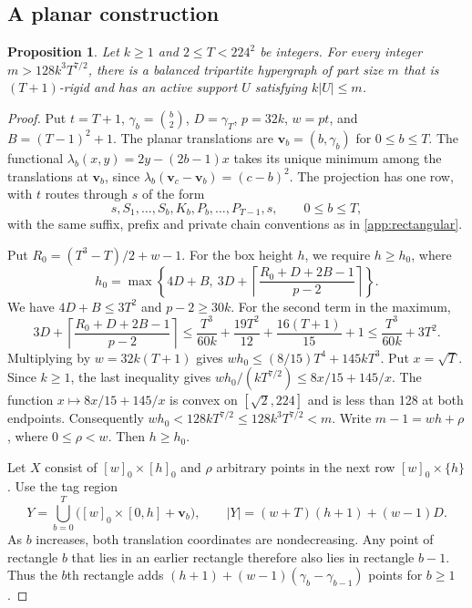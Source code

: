 \documentclass[10pt]{article}
\numberwithin{equation}{section}
\newtheorem{proposition}[proposition]{Proposition}
\theoremstyle{definition}
\begin{document}
\subsection{A planar construction}\label{app:planar}

\begin{proposition}\label{prop:planar-factor}
Let $k\ge1$ and $2\le T<224^2$ be integers. For every integer $m>128k^3T^{7/2}$, there is a balanced tripartite hypergraph of part size $m$ that is $(T+1)$-rigid and has an active support $U$ satisfying $k|U|\le m$.
\end{proposition}

\begin{proof}
Put $t=T+1$, $\gamma_b=\binom b2$, $D=\gamma_T$, $p=32k$, $w=pt$, and $B=(T-1)^2+1$. The planar translations are $\mathbf v_b=(b,\gamma_b)$ for $0\le b\le T$. The functional $\lambda_b(x,y)=2y-(2b-1)x$ takes its unique minimum among the translations at $\mathbf v_b$, since $\lambda_b(\mathbf v_c-\mathbf v_b)=(c-b)^2$. The projection has one row, with $t$ routes through $s$ of the form
\[
 s,S_1,\ldots,S_b,K_b,P_b,\ldots,P_{T-1},s,\qquad 0\le b\le T,
\]
with the same suffix, prefix and private chain conventions as in \cref{app:rectangular}.

Put $R_0=(T^3-T)/2+w-1$. For the box height $h$, we require $h\ge h_0$, where
\begin{equation}\label{eq:planar-height}
 h_0=\max\left\{4D+B,\ 3D+\left\lceil\frac{R_0+D+2B-1}{p-2}\right\rceil\right\}.
\end{equation}
We have $4D+B\le3T^2$ and $p-2\ge30k$. For the second term in the maximum,
\[
 3D+\left\lceil\frac{R_0+D+2B-1}{p-2}\right\rceil
 \le\frac{T^3}{60k}+\frac{19T^2}{12}+\frac{16(T+1)}{15}+1
 \le\frac{T^3}{60k}+3T^2.
\]
Multiplying by $w=32k(T+1)$ gives $wh_0\le(8/15)T^4+145kT^3$. Put $x=\sqrt T$. Since $k\ge1$, the last inequality gives $wh_0/(kT^{7/2})\le 8x/15+145/x$. The function $x\mapsto 8x/15+145/x$ is convex on $[\sqrt2,224]$ and is less than 128 at both endpoints. Consequently $wh_0<128kT^{7/2}\le128k^3T^{7/2}<m$. Write $m-1=wh+\rho$, where $0\le\rho<w$. Then $h\ge h_0$.

Let $X$ consist of $[w]_0\times[h]_0$ and $\rho$ arbitrary points in the next row $[w]_0\times\{h\}$. Use the tag region
\[
 Y=\bigcup_{b=0}^T\bigl([w]_0\times[0,h]+\mathbf v_b\bigr),
 \qquad |Y|=(w+T)(h+1)+(w-1)D .
\]
As $b$ increases, both translation coordinates are nondecreasing. Any point of rectangle $b$ that lies in an earlier rectangle therefore also lies in rectangle $b-1$. Thus the $b$th rectangle adds $(h+1)+(w-1)(\gamma_b-\gamma_{b-1})$ points for $b\ge1$.


\end{proof}
\end{document}

